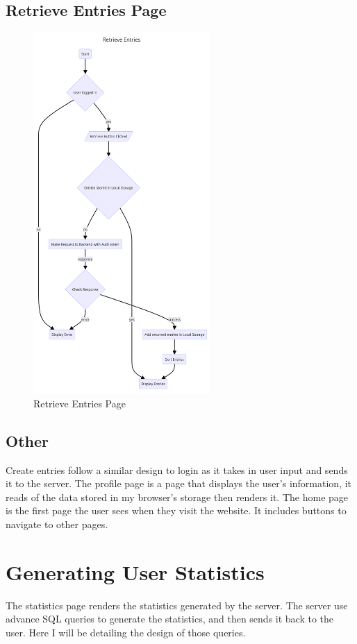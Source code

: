 \subsection{Retrieve Entries Page}
\begin{figure}[H]
    \centering
    \includegraphics[width=0.6\textwidth]{Assets/retrievePageFlow.png}
    \caption{Retrieve Entries Page}
\end{figure}


\subsection{Other}
Create entries follow a similar design to login as it takes in user input and sends it to the server. The profile page is a page that displays the user's information, it reads of the data stored in my browser's storage then renders it. The home page is the first page the user sees when they visit the website. It includes buttons to navigate to other pages. 

\section{Generating User Statistics}
The statistics page renders the statistics generated by the server. The server use advance SQL queries to generate the statistics, and then sends it back to the user. Here I will be detailing the design of those queries.

